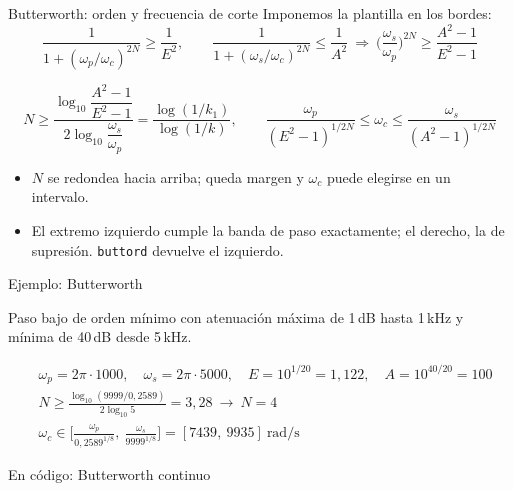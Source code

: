 \documentclass[aspectratio=169,11pt]{beamer}
\begin{document}
\begin{frame}{Butterworth: orden y frecuencia de corte}
  Imponemos la plantilla en los bordes:
  \[
    \frac{1}{1+(\omega_p/\omega_c)^{2N}}\ge\frac1{E^2},\qquad
    \frac{1}{1+(\omega_s/\omega_c)^{2N}}\le\frac1{A^2}
    \ \Rightarrow\
    \Big(\frac{\omega_s}{\omega_p}\Big)^{2N}\ge\frac{A^2-1}{E^2-1}
  \]
  \begin{importante}
    \[
      N\ge\frac{\log_{10}\dfrac{A^2-1}{E^2-1}}{2\log_{10}\dfrac{\omega_s}{\omega_p}}=\frac{\log(1/k_1)}{\log(1/k)},
      \qquad
      \frac{\omega_p}{(E^2-1)^{1/2N}}\le\omega_c\le\frac{\omega_s}{(A^2-1)^{1/2N}}
    \]
  \end{importante}
  \begin{itemize}\small
    \item $N$ se redondea hacia arriba; queda margen y $\omega_c$ puede elegirse en un intervalo.
    \item El extremo izquierdo cumple la banda de paso exactamente; el derecho, la de supresión. \texttt{buttord} devuelve el izquierdo.
  \end{itemize}
\end{frame}

\begin{frame}{Ejemplo: Butterworth}
  \begin{ejemplo}[Enunciado]
    Paso bajo de orden mínimo con atenuación máxima de 1\,dB hasta 1\,kHz y mínima de 40\,dB desde 5\,kHz.
  \end{ejemplo}
  \begin{align*}
    &\omega_p=2\pi\cdot1000,\quad \omega_s=2\pi\cdot5000,\quad E=10^{1/20}=1{,}122,\quad A=10^{40/20}=100\\
    &N\ge\frac{\log_{10}(9999/0{,}2589)}{2\log_{10}5}=3{,}28\ \to\ N=4\\
    &\omega_c\in\Big[\frac{\omega_p}{0{,}2589^{1/8}},\ \frac{\omega_s}{9999^{1/8}}\Big]=[7439,\ 9935]\ \text{rad/s}
  \end{align*}
\end{frame}

\begin{frame}{En código: Butterworth continuo}
\end{frame}

\end{document}
